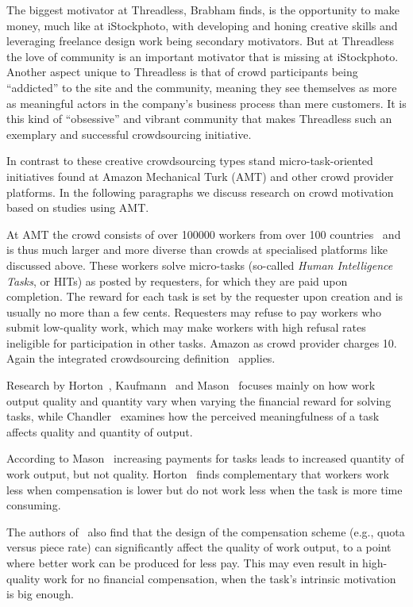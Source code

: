 \documentclass{sig-alternate}
\begin{document}
The biggest motivator at Threadless, Brabham finds, is the opportunity to make
money, much like at iStockphoto, with developing and honing creative skills and
leveraging freelance design work being secondary motivators. But at Threadless
the love of community is an important motivator that is missing at iStockphoto.
Another aspect unique to Threadless is that of crowd participants being
``addicted'' to the site and the community, meaning they see themselves as more
as meaningful actors in the company's business process than mere customers. It
is this kind of ``obsessive'' and vibrant community that makes Threadless such
an exemplary and successful crowdsourcing initiative.

In contrast to these creative crowdsourcing types stand micro-task-oriented
initiatives found at Amazon Mechanical Turk (AMT) and other crowd provider
platforms. In the following paragraphs we discuss research on crowd motivation
based on studies using AMT.

At AMT the crowd consists of over \num{100000} workers from over \num{100}
countries~\cite{buhrmester2011amazon} and is thus much larger and more diverse
than crowds at specialised platforms like discussed above. These workers solve
micro-tasks (so-called \emph{Human Intelligence Tasks}, or HITs) as posted by
requesters, for which they are paid upon completion.  The reward for each task
is set by the requester upon creation and is usually no more than a few cents.
Requesters may refuse to pay workers who submit low-quality work, which may
make workers with high refusal rates ineligible for participation in other
tasks. Amazon as crowd provider charges \num{10}\percent. Again the integrated
crowdsourcing definition~\cite{estelles2012towards} applies.

Research by Horton~\cite{horton2010labor}, Kaufmann~\cite{kaufmann2011more} and
Mason~\cite{mason2010financial} focuses mainly on how work output quality and quantity
vary when varying the financial reward for solving tasks,
while Chandler~\cite{chandler2013breaking} examines how the perceived
meaningfulness of a task affects quality and quantity of output.

According to Mason~\cite{mason2010financial} increasing payments for tasks
leads to increased quantity of work output, but not quality.
Horton~\cite{horton2010labor} finds complementary that workers work less when
compensation is lower but do not work less when the task is more time
consuming. 

The authors of~\cite{mason2010financial} also find that the design of the
compensation scheme (e.g., quota versus piece rate) can significantly affect
the quality of work output, to a point where better work can be produced for
less pay. This may even result in high-quality work for no financial
compensation, when the task's intrinsic motivation is big enough.
\end{document}
